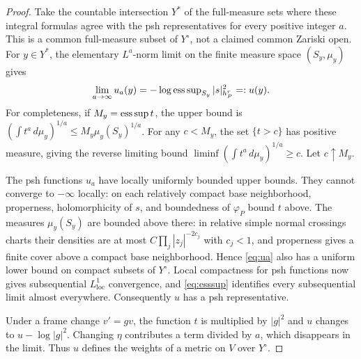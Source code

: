 \begin{proof}
Take the countable intersection $Y^*$ of the full-measure sets where these integral formulas agree with the psh representatives for every positive integer $a$. This is a common full-measure subset of $Y^\circ$, not a claimed common Zariski open. For $y\in Y^*$, the elementary $L^a$-norm limit on the finite measure space $(S_y,\mu_y)$ gives
\begin{equation}\label{eq:esssup}
\lim_{a\to\infty}u_a(y)
=-\log\operatorname{ess\,sup}_{S_y}|s|_{h_P^r}^2=:u(y).
\end{equation}
For completeness, if $M_y=\operatorname{ess\,sup} t$, the upper bound is
$(\int t^a\,d\mu_y)^{1/a}\le M_y\mu_y(S_y)^{1/a}$.
For any $c<M_y$, the set $\{t>c\}$ has positive measure, giving the reverse limiting bound $\liminf(\int t^a\,d\mu_y)^{1/a}\ge c$. Let $c\uparrow M_y$.

The psh functions $u_a$ have locally uniformly bounded upper bounds. They cannot converge to $-\infty$ locally: on each relatively compact base neighborhood, properness, holomorphicity of $s$, and boundedness of $\varphi_P$ bound $t$ above. The measures $\mu_y(S_y)$ are bounded above there: in relative simple normal crossings charts their densities are at most $C\prod_j|z_j|^{-2c_j}$ with $c_j<1$, and properness gives a finite cover above a compact base neighborhood. Hence \eqref{eq:ua} also has a uniform lower bound on compact subsets of $Y^\circ$. Local compactness for psh functions now gives subsequential $L^1_{\mathrm{loc}}$ convergence, and \eqref{eq:esssup} identifies every subsequential limit almost everywhere. Consequently $u$ has a psh representative.

Under a frame change $v'=gv$, the function $t$ is multiplied by $|g|^2$ and $u$ changes to $u-\log|g|^2$. Changing $\eta$ contributes a term divided by $a$, which disappears in the limit. Thus $u$ defines the weights of a metric on $V$ over $Y^\circ$.


\end{proof}
